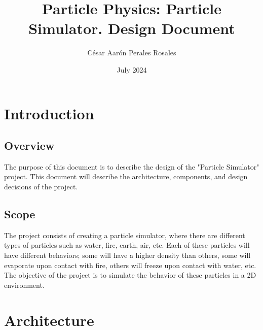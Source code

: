 \documentclass{article}
\title{Particle Physics: Particle Simulator. Design Document}
\author{César Aarón Perales Rosales}
\date{July 2024}
\begin{document}
\maketitle

\newpage

\tableofcontents

\newpage

\section{Introduction}

\subsection{Overview}

The purpose of this document is to describe the design of the "Particle Simulator" project. This document will describe the architecture, components, and design decisions of the project.

\subsection{Scope}

The project consists of creating a particle simulator, where there are different types of particles such as water, fire, earth, air, etc. Each of these particles will have different behaviors; some will have a higher density than others, some will evaporate upon contact with fire, others will freeze upon contact with water, etc. The objective of the project is to simulate the behavior of these particles in a 2D environment.

\section{Architecture}
\end{document}
